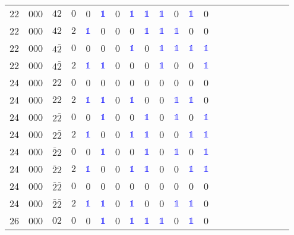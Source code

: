 \begin{longtable*}{c| cccccccccccccccccccc }
22& 000& $42$& $0$& 0& \textcolor{blue}{$\mathds{1}$}& 0& \textcolor{blue}{$\mathds{1}$}& \textcolor{blue}{$\mathds{1}$}& \textcolor{blue}{$\mathds{1}$}& 0& \textcolor{blue}{$\mathds{1}$}& 0\\
22& 000& $42$& $2$& \textcolor{blue}{$\mathds{1}$}& 0& 0& 0& \textcolor{blue}{$\mathds{1}$}& \textcolor{blue}{$\mathds{1}$}& \textcolor{blue}{$\mathds{1}$}& 0& 0\\
22& 000& $4\bar{2}$& $0$& 0& 0& 0& \textcolor{blue}{$\mathds{1}$}& 0& \textcolor{blue}{$\mathds{1}$}& \textcolor{blue}{$\mathds{1}$}& \textcolor{blue}{$\mathds{1}$}& \textcolor{blue}{$\mathds{1}$}\\
22& 000& $4\bar{2}$& $2$& \textcolor{blue}{$\mathds{1}$}& \textcolor{blue}{$\mathds{1}$}& 0& 0& 0& \textcolor{blue}{$\mathds{1}$}& 0& 0& \textcolor{blue}{$\mathds{1}$}\\
24& 000& $22$& $0$& 0& 0& 0& 0& 0& 0& 0& 0& 0\\
24& 000& $22$& $2$& \textcolor{blue}{$\mathds{1}$}& \textcolor{blue}{$\mathds{1}$}& 0& \textcolor{blue}{$\mathds{1}$}& 0& 0& \textcolor{blue}{$\mathds{1}$}& \textcolor{blue}{$\mathds{1}$}& 0\\
24& 000& $2\bar{2}$& $0$& 0& \textcolor{blue}{$\mathds{1}$}& 0& 0& \textcolor{blue}{$\mathds{1}$}& 0& \textcolor{blue}{$\mathds{1}$}& 0& \textcolor{blue}{$\mathds{1}$}\\
24& 000& $2\bar{2}$& $2$& \textcolor{blue}{$\mathds{1}$}& 0& 0& \textcolor{blue}{$\mathds{1}$}& \textcolor{blue}{$\mathds{1}$}& 0& 0& \textcolor{blue}{$\mathds{1}$}& \textcolor{blue}{$\mathds{1}$}\\
24& 000& $\bar{2}2$& $0$& 0& \textcolor{blue}{$\mathds{1}$}& 0& 0& \textcolor{blue}{$\mathds{1}$}& 0& \textcolor{blue}{$\mathds{1}$}& 0& \textcolor{blue}{$\mathds{1}$}\\
24& 000& $\bar{2}2$& $2$& \textcolor{blue}{$\mathds{1}$}& 0& 0& \textcolor{blue}{$\mathds{1}$}& \textcolor{blue}{$\mathds{1}$}& 0& 0& \textcolor{blue}{$\mathds{1}$}& \textcolor{blue}{$\mathds{1}$}\\
24& 000& $\bar{2}\bar{2}$& $0$& 0& 0& 0& 0& 0& 0& 0& 0& 0\\
24& 000& $\bar{2}\bar{2}$& $2$& \textcolor{blue}{$\mathds{1}$}& \textcolor{blue}{$\mathds{1}$}& 0& \textcolor{blue}{$\mathds{1}$}& 0& 0& \textcolor{blue}{$\mathds{1}$}& \textcolor{blue}{$\mathds{1}$}& 0\\
26& 000& $02$& $0$& 0& \textcolor{blue}{$\mathds{1}$}& 0& \textcolor{blue}{$\mathds{1}$}& \textcolor{blue}{$\mathds{1}$}& \textcolor{blue}{$\mathds{1}$}& 0& \textcolor{blue}{$\mathds{1}$}& 0\\

\end{longtable*}
